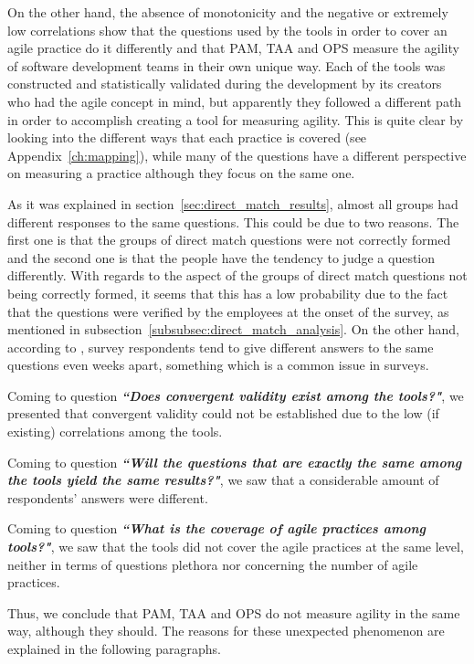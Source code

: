 On the other hand, the absence of monotonicity and the negative or extremely low correlations show that the questions used by the tools in order to cover an agile practice do it differently and that \ac{PAM}, \ac{TAA} and \ac{OPS} measure the agility of software development teams in their own unique way. Each of the tools was constructed and statistically validated during the development by its creators who had the agile concept in mind, but apparently they followed a different path in order to accomplish creating a tool for measuring agility. This is quite clear by looking into the different ways that each practice is covered (see Appendix~\ref{ch:mapping}), while many of the questions have a different perspective on measuring a practice although they focus on the same one. 

As it was explained in section~\ref{sec:direct_match_results}, almost all groups had different responses to the same questions. This could be due to two reasons. The first one is that the groups of direct match questions were not correctly formed and the second one is that the people have the tendency to judge a question differently. With regards to the aspect of the groups of direct match questions not being correctly formed, it seems that this has a low probability due to the fact that the questions were verified by the employees at the onset of the survey, as mentioned in subsection~\ref{subsubsec:direct_match_analysis}. On the other hand, according to \citet{Lacy}, survey respondents tend to give different answers to the same questions even weeks apart, something which is a common issue in surveys.

Coming to question \textbf{\textit{``Does convergent validity exist among the tools?"}}, we presented that convergent validity could not be established due to the low (if existing) correlations among the tools.

Coming to question \textbf{\textit{``Will the questions that are exactly the same among the tools yield the same results?"}}, we saw that a considerable amount of respondents' answers were different.

Coming to question \textbf{\textit{``What is the coverage of agile practices among tools?"}}, we saw that the tools did not cover the agile practices at the same level, neither in terms of questions plethora nor concerning the number of agile practices.

Thus, we conclude that \ac{PAM}, \ac{TAA} and \ac{OPS} do not measure agility in the same way, although they should. The reasons for these unexpected phenomenon are explained in the following paragraphs.

